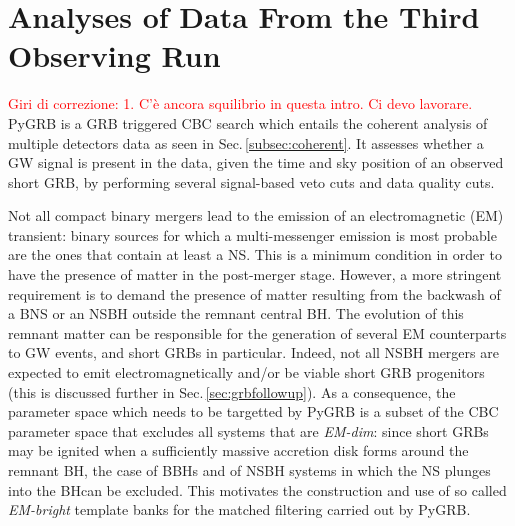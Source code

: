 \documentclass[binding=0.6cm, LaM]{sapthesis}
\newcommand{\fpg}[1]{\textcolor{red}{#1} }
\begin{document}
\chapter{Analyses of Data From the Third Observing Run}
\label{ch:datanalysis}
\fpg{Giri di correzione: 1.}%
\fpg{C'\`e ancora squilibrio in questa intro.  Ci devo lavorare.}
        {\ttfamily PyGRB} is a GRB triggered CBC search
	which entails the coherent analysis of multiple detectors data as seen in Sec.\,\ref{subsec:coherent}. 
	It assesses whether a GW signal is present in the data, 
	given the time and sky position of an observed short GRB,
	by performing several signal-based veto cuts and data quality cuts.

	Not all compact binary mergers lead to the emission of an electromagnetic (EM) transient: 
	binary sources for which a multi-messenger emission is most probable are the ones that contain at least a NS.
	This is a minimum condition in order to have the presence of matter in the post-merger stage.
	However, a more stringent requirement is to demand
	the presence of matter resulting from the backwash of a BNS or an NSBH
	outside the remnant central BH.
	The evolution of this remnant matter can be responsible for the generation of several EM counterparts to GW events, and short GRBs in particular.
	Indeed, not all NSBH mergers are expected to emit electromagnetically and/or be viable short GRB progenitors (this is discussed further in Sec.\,\ref{sec:grbfollowup}).
	As a consequence, the parameter space which needs to be targetted by {\ttfamily PyGRB}
	is a subset of the CBC parameter space that excludes all systems that are \textit{EM-dim}:
	since short GRBs may be ignited when a sufficiently massive accretion disk forms around the remnant BH,
	the case of BBHs and of NSBH systems in which the NS plunges into the BHcan be excluded.
	This motivates the construction and use of 
	so called \textit{EM-bright} template banks for the matched filtering carried out by {\ttfamily PyGRB}.
\end{document}

